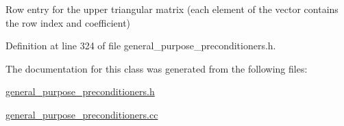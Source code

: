 Row entry for the upper triangular matrix (each element of the vector contains the row index and coefficient) 



Definition at line 324 of file general\+\_\+purpose\+\_\+preconditioners.\+h.



The documentation for this class was generated from the following files\+:\begin{DoxyCompactItemize}
\item 
\hyperlink{general__purpose__preconditioners_8h}{general\+\_\+purpose\+\_\+preconditioners.\+h}\item 
\hyperlink{general__purpose__preconditioners_8cc}{general\+\_\+purpose\+\_\+preconditioners.\+cc}\end{DoxyCompactItemize}
